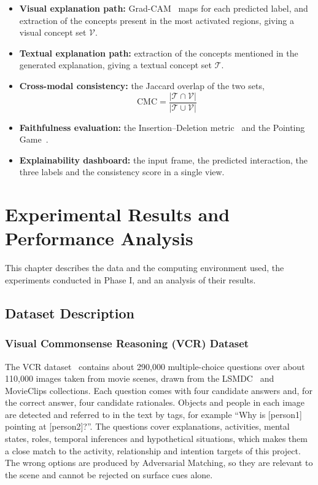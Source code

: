 \documentclass[12pt,a4paper,oneside]{report}
\begin{document}
\begin{itemize}[leftmargin=*]
\item \textbf{Visual explanation path:} Grad-CAM~\cite{selvaraju2017gradcam}
  maps for each predicted label, and extraction of the concepts present in the
  most activated regions, giving a visual concept set $\mathcal{V}$.
\item \textbf{Textual explanation path:} extraction of the concepts mentioned in
  the generated explanation, giving a textual concept set $\mathcal{T}$.
\item \textbf{Cross-modal consistency:} the Jaccard overlap of the two sets,
  \begin{equation}
    \mathrm{CMC} = \frac{|\mathcal{T} \cap \mathcal{V}|}{|\mathcal{T} \cup \mathcal{V}|}
    \label{eq:cmc}
  \end{equation}
\item \textbf{Faithfulness evaluation:} the Insertion--Deletion
  metric~\cite{petsiuk2018rise} and the Pointing Game~\cite{zhang2018excitation}.
\item \textbf{Explainability dashboard:} the input frame, the predicted
  interaction, the three labels and the consistency score in a single view.
\end{itemize}

\chapter{Experimental Results and Performance Analysis}
\label{ch:results}

This chapter describes the data and the computing environment used, the
experiments conducted in Phase I, and an analysis of their results.

\section{Dataset Description}

\subsection{Visual Commonsense Reasoning (VCR) Dataset}

The VCR dataset~\cite{zellers2019vcr} contains about 290,000 multiple-choice
questions over about 110,000 images taken from movie scenes, drawn from the
LSMDC~\cite{rohrbach2017lsmdc} and MovieClips collections. Each question comes
with four candidate answers and, for the correct answer, four candidate
rationales. Objects and people in each image are detected and referred to in
the text by tags, for example ``Why is [person1] pointing at [person2]?''. The
questions cover explanations, activities, mental states, roles, temporal
inferences and hypothetical situations, which makes them a close match to the
activity, relationship and intention targets of this project. The wrong options
are produced by Adversarial Matching, so they are relevant to the scene and
cannot be rejected on surface cues alone.
\end{document}
